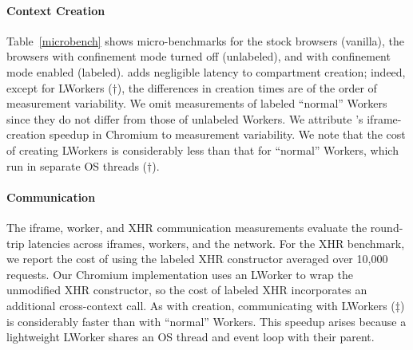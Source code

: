 \paragraph{Context Creation}
Table~\ref{microbench} shows micro-benchmarks for the stock
browsers (vanilla), the \sys{} browsers with confinement mode turned
off (unlabeled), and with confinement mode enabled (labeled).
%
\sys{} adds negligible latency to compartment creation; indeed, except
for LWorkers ($\dagger$), the differences in creation times are of the
order of measurement variability.
%
We omit measurements of labeled ``normal'' Workers since they do
not differ from those of unlabeled Workers.
%
We attribute \sys{}'s iframe-creation speedup in Chromium to measurement
variability.
%
We note that the cost of creating LWorkers is
considerably less than that for ``normal'' Workers, which run in
separate OS threads ($\dagger$).

\paragraph{Communication} The iframe, worker, and XHR communication measurements evaluate the
round-trip latencies across iframes, workers, and the network.
%
For the XHR benchmark, we report the cost of using the labeled XHR
constructor averaged over 10,000 requests.
%
Our Chromium implementation uses an  LWorker to wrap the unmodified
XHR constructor, so the cost of labeled XHR incorporates an additional
cross-context call.
%
As with creation, communicating with LWorkers ($\ddagger$)
is considerably faster than with ``normal'' Workers.
%
This speedup arises because a lightweight LWorker shares
 an OS thread and event loop with their parent.
%


